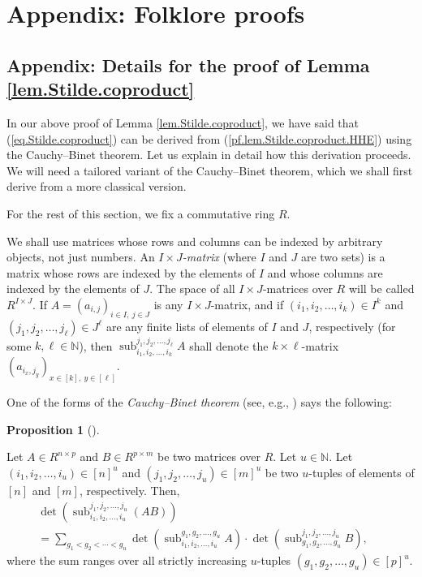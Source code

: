 \documentclass[numbers=enddot,12pt,final,onecolumn,notitlepage]{scrartcl}%
\numberwithin{exer}{section}
\theoremstyle{definition}
\newtheorem{prop}[theo]{Proposition}
\newenvironment{proposition}[1][]
{\begin{prop}[#1]\begin{leftbar}}
{\end{leftbar}\end{prop}}
\let\sumnonlimits\sum
\renewcommand{\sum}{\sumnonlimits\limits}
\theoremstyle{plainsl}
\begin{document}
\section{Appendix: Folklore proofs}

\subsection{\label{sec.apx-coprod}Appendix: Details for the proof of Lemma
\ref{lem.Stilde.coproduct}}

In our above proof of Lemma \ref{lem.Stilde.coproduct}, we have said that
(\ref{eq.Stilde.coproduct}) can be derived from
(\ref{pf.lem.Stilde.coproduct.HHE}) using the Cauchy--Binet theorem. Let us
explain in detail how this derivation proceeds. We will need a tailored
variant of the Cauchy--Binet theorem, which we shall first derive from a more
classical version.

For the rest of this section, we fix a commutative ring $R$.

We shall use matrices whose rows and columns can be indexed by arbitrary
objects, not just numbers. An $I\times J$\emph{-matrix} (where $I$ and $J$ are
two sets) is a matrix whose rows are indexed by the elements of $I$ and whose
columns are indexed by the elements of $J$. The space of all $I\times
J$-matrices over $R$ will be called $R^{I\times J}$. If $A=\left(
a_{i,j}\right)  _{i\in I,\ j\in J}$ is any $I\times J$-matrix, and if $\left(
i_{1},i_{2},\ldots,i_{k}\right)  \in I^{k}$ and $\left(  j_{1},j_{2}%
,\ldots,j_{\ell}\right)  \in J^{\ell}$ are any finite lists of elements of $I$
and $J$, respectively (for some $k,\ell\in\mathbb{N}$), then
$\operatorname*{sub}\nolimits_{i_{1},i_{2},\ldots,i_{k}}^{j_{1},j_{2}%
,\ldots,j_{\ell}}A$ shall denote the $k\times\ell$-matrix $\left(
a_{i_{x},j_{y}}\right)  _{x\in\left[  k\right]  ,\ y\in\left[  \ell\right]  }$.

One of the forms of the \emph{Cauchy--Binet theorem} (see, e.g.,
\cite[Corollary 7.182]{detnotes}) says the following:

\begin{proposition}
\label{prop.CB1}Let $A\in R^{n\times p}$ and $B\in R^{p\times m}$ be two
matrices over $R$. Let $u\in\mathbb{N}$. Let $\left(  i_{1},i_{2},\ldots
,i_{u}\right)  \in\left[  n\right]  ^{u}$ and $\left(  j_{1},j_{2}%
,\ldots,j_{u}\right)  \in\left[  m\right]  ^{u}$ be two $u$-tuples of elements
of $\left[  n\right]  $ and $\left[  m\right]  $, respectively. Then,%
\begin{align}
&  \det\left(  \operatorname*{sub}\nolimits_{i_{1},i_{2},\ldots,i_{u}}%
^{j_{1},j_{2},\ldots,j_{u}}\left(  AB\right)  \right) \nonumber\\
&  =\sum_{g_{1}<g_{2}<\cdots<g_{u}}\det\left(  \operatorname*{sub}%
\nolimits_{i_{1},i_{2},\ldots,i_{u}}^{g_{1},g_{2},\ldots,g_{u}}A\right)
\cdot\det\left(  \operatorname*{sub}\nolimits_{g_{1},g_{2},\ldots,g_{u}%
}^{j_{1},j_{2},\ldots,j_{u}}B\right)
,\ \ \ \ \ \ \ \ \ \ \label{pf.lem.Stilde.coproduct.CB1}%
\end{align}
where the sum ranges over all strictly increasing $u$-tuples $\left(
g_{1},g_{2},\ldots,g_{u}\right)  \in\left[  p\right]  ^{u}$.
\end{proposition}
\end{document}
